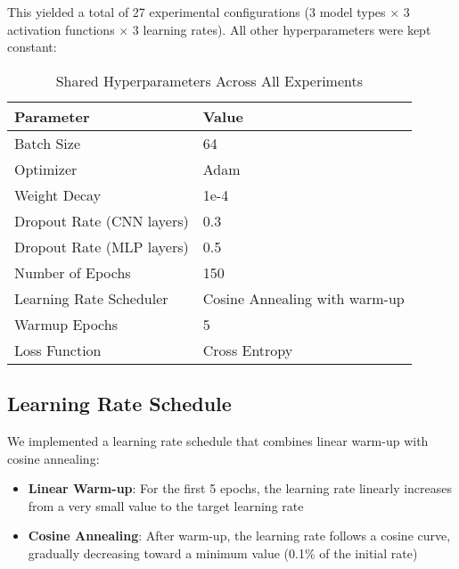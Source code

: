 This yielded a total of 27 experimental configurations (3 model types × 3 activation functions × 3 learning rates). All other hyperparameters were kept constant:

\begin{table}[h]
\centering
\caption{Shared Hyperparameters Across All Experiments}
\label{tab:hyperparams}
\begin{tabular}{@{}ll@{}}
\toprule
\textbf{Parameter} & \textbf{Value} \\
\midrule
Batch Size & 64 \\
Optimizer & Adam \\
Weight Decay & 1e-4 \\
Dropout Rate (CNN layers) & 0.3 \\
Dropout Rate (MLP layers) & 0.5 \\
Number of Epochs & 150 \\
Learning Rate Scheduler & Cosine Annealing with warm-up \\
Warmup Epochs & 5 \\
Loss Function & Cross Entropy \\
\bottomrule
\end{tabular}
\end{table}

\subsection{Learning Rate Schedule}

We implemented a learning rate schedule that combines linear warm-up with cosine annealing:

\begin{itemize}
    \item \textbf{Linear Warm-up}: For the first 5 epochs, the learning rate linearly increases from a very small value to the target learning rate
    \item \textbf{Cosine Annealing}: After warm-up, the learning rate follows a cosine curve, gradually decreasing toward a minimum value (0.1\% of the initial rate)
\end{itemize}

